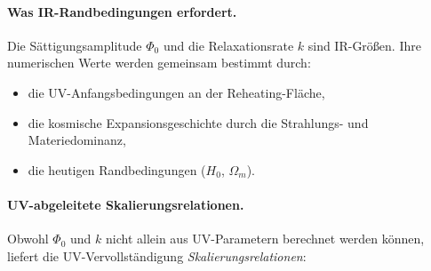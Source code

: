 \documentclass[aps,prd,twocolumn,superscriptaddress,nofootinbib]{revtex4-2}
\begin{document}
\paragraph{Was IR-Randbedingungen erfordert.}
Die Sättigungsamplitude $\Phi_0$ und die Relaxationsrate $k$ sind IR-Größen. Ihre numerischen Werte werden gemeinsam bestimmt durch:
\begin{itemize}
\item die UV-Anfangsbedingungen an der Reheating-Fläche,
\item die kosmische Expansionsgeschichte durch die Strahlungs- und Materiedominanz,
\item die heutigen Randbedingungen ($H_0$, $\Omega_m$).
\end{itemize}

\paragraph{UV-abgeleitete Skalierungsrelationen.}
Obwohl $\Phi_0$ und $k$ nicht allein aus UV-Parametern berechnet werden können, liefert die UV-Vervollständigung \textit{Skalierungsrelationen}:
\end{document}
